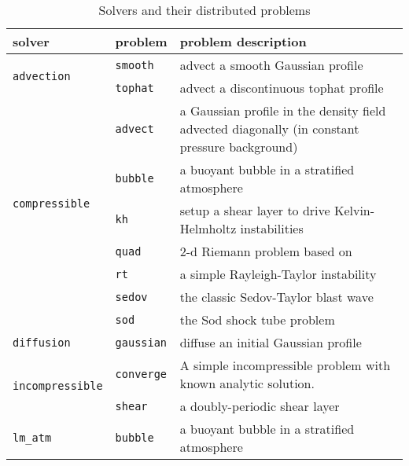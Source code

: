 \begin{table*}[t]
\centering
\renewcommand{\arraystretch}{1.2}
\begin{tabular}{llp{2.5in}}
\hline
{\bf solver} & {\bf problem} 
   & {\bf problem description} \\
\hline
%
\multirow{2}{*}{\tt advection}
   & {\tt smooth} & advect a smooth Gaussian profile \\
   & {\tt tophat} & advect a discontinuous tophat profile \\
\hline
%
\multirow{6}{*}{\tt compressible}
   & {\tt advect} & a Gaussian profile in the density field advected diagonally (in constant pressure background) \\
   & {\tt bubble} & a buoyant bubble in a stratified atmosphere \\
   & {\tt kh} & setup a shear layer to drive Kelvin-Helmholtz instabilities \\
   & {\tt quad} & 2-d Riemann problem based on \cite{schulz-rinne:1993}  \\
   & {\tt rt}  & a simple Rayleigh-Taylor instability\\
   & {\tt sedov} & the classic Sedov-Taylor blast wave \\
   & {\tt sod} & the Sod shock tube problem  \\
\hline
%
{\tt diffusion}& {\tt gaussian}
   & diffuse an initial Gaussian profile \\
\hline
%
\multirow{2}{*}{\tt incompressible}
   & {\tt converge} & A simple incompressible problem with known
                      analytic solution.\\
   & {\tt shear} & a doubly-periodic shear layer \\
\hline
%
\multirow{2}{*}{\tt lm\_atm}
   & {\tt bubble} & a buoyant bubble in a stratified atmosphere \\
\hline
\end{tabular}
\caption{\label{tab:problems} Solvers and their distributed problems}
\renewcommand{\arraystretch}{1.0}
\end{table*}




